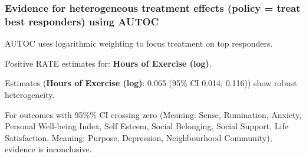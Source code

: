 \documentclass[
  single column]{article}
\begin{document}
\subsubsection{Evidence for heterogeneous treatment effects (policy =
treat best responders) using
AUTOC}\label{evidence-for-heterogeneous-treatment-effects-policy-treat-best-responders-using-autoc}

AUTOC uses logarithmic weighting to focus treatment on top responders.

Positive RATE estimates for: \textbf{Hours of Exercise (log)}.

Estimates (\textbf{Hours of Exercise (log)}: 0.065 (95\% CI 0.014,
0.116)) show robust heterogeneity.

For outcomes with 95\%\% CI crossing zero (Meaning: Sense, Rumination,
Anxiety, Personal Well-being Index, Self Esteem, Social Belonging,
Social Support, Life Satisfaction, Meaning: Purpose, Depression,
Neighbourhood Community), evidence is inconclusive.
\end{document}
